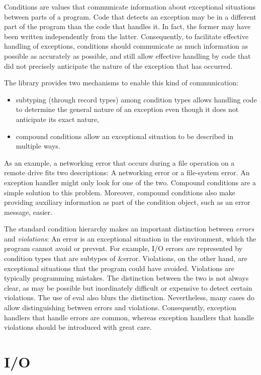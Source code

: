 \documentclass[twoside,twocolumn]{algol60}
\begin{document}
Conditions are values that communicate information about exceptional
situations between parts of a program. Code that detects an exception
may be in a different part of the program than the code that handles
it. In fact, the former may have been written independently from the
latter.  Consequently, to facilitate effective handling of exceptions,
conditions should communicate as much information as possible as
accurately as possible, and still allow effective handling by code
that did not precisely anticipate the nature of the exception that has
occurred.

The  library provides two mechanisms to
enable this kind of communication:
%
\begin{itemize}
\item subtyping (through record types) among condition types allows
  handling code to determine the general nature of an exception even
  though it does not anticipate its exact nature,
\item compound conditions allow an exceptional situation to be
  described in multiple ways.
\end{itemize}
%
As an example, a networking error that occurs during a file operation
on a remote drive fits two descriptions: A networking error or a
file-system error.  An exception handler might only look for one of
the two.  Compound conditions are a simple solution to this problem.
Moreover, compound conditions also make providing auxiliary
information as part of the condition object, such as an error message,
easier.

The standard condition hierarchy makes an important distinction
between \emph{errors} and \emph{violations}: An error is an
exceptional situation in the environment, which the program cannot
avoid or prevent.  For example, I/O errors are represented by
condition types that are subtypes of {\cf\&error}.  Violations, on the
other hand, are exceptional situations that the program could have
avoided.  Violations are typically programming mistakes.  The
distinction between the two is not always clear, as may be possible
but inordinately difficult or expensive to detect certain violations.
The use of {\cf eval} also blurs the distinction.  Nevertheless, many
cases do allow distinguishing between errors and violations.
Consequently, exception handlers that handle errors are common,
whereas exception handlers that handle violations should be introduced
with great care.


\chapter{I/O}
\end{document}
